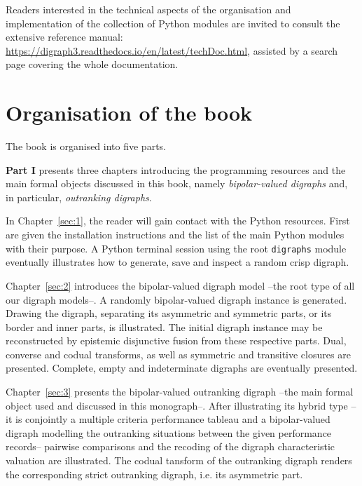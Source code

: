 Readers interested in the technical aspects of the organisation and implementation of the collection of \Digraph Python modules are invited to consult the extensive reference manual: \href{https://digraph3.readthedocs.io/en/latest/techDoc.html}{https://digraph3.readthedocs.io/en/latest/techDoc.html}, assisted by a search page covering the whole \Digraph documentation. 

{}
\section*{Organisation of the book}
\label{sec:0.2}

The book is organised into five parts.
\vspace{5pt}

\textbf{Part I} presents three chapters introducing the \Digraph programming resources and the main formal objects discussed in this book, namely \emph{bipolar-valued digraphs} and, in particular, \emph{outranking digraphs}.

In Chapter~\ref{sec:1}, the reader will gain contact with the \Digraph Python resources. First are given the installation instructions and the list of the main \Digraph Python modules with their purpose. A Python terminal session using the root \texttt{digraphs} module eventually illustrates how to generate, save and inspect a random crisp digraph.

Chapter~\ref{sec:2} introduces the bipolar-valued digraph model --the root type of all our digraph models--. A randomly bipolar-valued digraph instance is generated. Drawing the digraph, separating its asymmetric and symmetric parts, or its border and inner parts, is illustrated. The initial digraph instance may be reconstructed by epistemic disjunctive fusion from these respective parts. Dual, converse and codual transforms, as well as symmetric and transitive closures are presented. Complete, empty and indeterminate digraphs are eventually presented.

Chapter~\ref{sec:3} presents the bipolar-valued outranking digraph --the main formal object used and discussed in this monograph--. After illustrating its hybrid type --it is conjointly a multiple criteria performance tableau and a bipolar-valued digraph modelling the outranking situations between the given performance records-- pairwise comparisons and the recoding of the digraph characteristic valuation are illustrated. The codual tansform of the outranking digraph renders the corresponding strict outranking digraph, i.e. its asymmetric part. 
\vspace{5pt}

